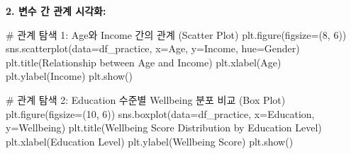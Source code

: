 \documentclass[
  letterpaper,
]{book}
\newenvironment{Shaded}{\begin{snugshade}}{\end{snugshade}}
\newcommand{\CommentTok}[1]{\textcolor[rgb]{0.37,0.37,0.37}{#1}}
\newcommand{\DecValTok}[1]{\textcolor[rgb]{0.68,0.00,0.00}{#1}}
\newcommand{\NormalTok}[1]{\textcolor[rgb]{0.00,0.23,0.31}{#1}}
\newcommand{\OperatorTok}[1]{\textcolor[rgb]{0.37,0.37,0.37}{#1}}
\newcommand{\StringTok}[1]{\textcolor[rgb]{0.13,0.47,0.30}{#1}}
\begin{document}
\textbf{2. 변수 간 관계 시각화:}

\begin{Shaded}
\begin{Highlighting}[]
\CommentTok{\# 관계 탐색 1: Age와 Income 간의 관계 (Scatter Plot)}
\NormalTok{plt.figure(figsize}\OperatorTok{=}\NormalTok{(}\DecValTok{8}\NormalTok{, }\DecValTok{6}\NormalTok{))}
\NormalTok{sns.scatterplot(data}\OperatorTok{=}\NormalTok{df\_practice, x}\OperatorTok{=}\StringTok{\textquotesingle{}Age\textquotesingle{}}\NormalTok{, y}\OperatorTok{=}\StringTok{\textquotesingle{}Income\textquotesingle{}}\NormalTok{, hue}\OperatorTok{=}\StringTok{\textquotesingle{}Gender\textquotesingle{}}\NormalTok{)}
\NormalTok{plt.title(}\StringTok{\textquotesingle{}Relationship between Age and Income\textquotesingle{}}\NormalTok{)}
\NormalTok{plt.xlabel(}\StringTok{\textquotesingle{}Age\textquotesingle{}}\NormalTok{)}
\NormalTok{plt.ylabel(}\StringTok{\textquotesingle{}Income\textquotesingle{}}\NormalTok{)}
\NormalTok{plt.show()}

\CommentTok{\# 관계 탐색 2: Education 수준별 Wellbeing 분포 비교 (Box Plot)}
\NormalTok{plt.figure(figsize}\OperatorTok{=}\NormalTok{(}\DecValTok{10}\NormalTok{, }\DecValTok{6}\NormalTok{))}
\NormalTok{sns.boxplot(data}\OperatorTok{=}\NormalTok{df\_practice, x}\OperatorTok{=}\StringTok{\textquotesingle{}Education\textquotesingle{}}\NormalTok{, y}\OperatorTok{=}\StringTok{\textquotesingle{}Wellbeing\textquotesingle{}}\NormalTok{)}
\NormalTok{plt.title(}\StringTok{\textquotesingle{}Wellbeing Score Distribution by Education Level\textquotesingle{}}\NormalTok{)}
\NormalTok{plt.xlabel(}\StringTok{\textquotesingle{}Education Level\textquotesingle{}}\NormalTok{)}
\NormalTok{plt.ylabel(}\StringTok{\textquotesingle{}Wellbeing Score\textquotesingle{}}\NormalTok{)}
\NormalTok{plt.show()}


\end{Highlighting}
\end{Shaded}
\end{document}

